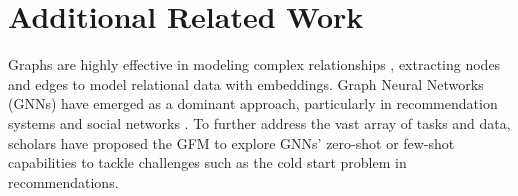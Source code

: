 \section{Additional Related Work}





 Graphs are highly effective in modeling complex relationships \citep{fey2023relational,cao2023relational,gao2020ci,chen2022gndan,wu2022graph,yang2021consisrec}, extracting nodes and edges to model relational data with embeddings. Graph Neural Networks (GNNs) \citep{Thomas2017GCN,hamilton2017graphsage,velivckovic2017gat,schlichtkrull2017modeling} have emerged as a dominant approach, particularly in recommendation systems \citep{Erxue2022recommender} and social networks \citep{wu2020social}. To further address the vast array of tasks and data, scholars have proposed the GFM \citep{chen2024llaga,liu2023one} to explore GNNs' zero-shot or few-shot capabilities \citep{fey2023relational,cao2023relational,gao2020ci,chen2022gndan} to tackle challenges such as the cold start problem in recommendations. 

